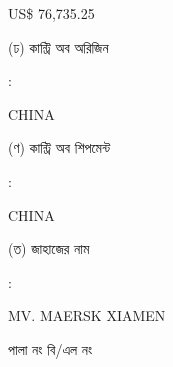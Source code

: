 \documentclass[12pt]{article}
\newcommand{\co}{CHINA}
\newcommand{\coship}{CHINA}
\newcommand{\vessel}{MV. MAERSK XIAMEN}
\newcommand{\price}{US\$ 76,735.25}
\begin{document}
\begin{minipage}[t]{0.50\linewidth}
{\price}
\\
\end{minipage}
\begin{minipage}[t]{0.05\linewidth}
\hspace*{1em}
\end{minipage}
\begin{minipage}[t]{0.45\linewidth}
(ঢ) কান্ট্রি অব অরিজিন
\end{minipage}
\begin{minipage}[t]{0.02\linewidth}
:
\end{minipage}
\begin{minipage}[t]{0.50\linewidth}
{\co}
\\
\end{minipage}
\begin{minipage}[t]{0.05\linewidth}
\hspace*{1em}
\end{minipage}
\begin{minipage}[t]{0.45\linewidth}
(ণ) কান্ট্রি অব শিপমেন্ট
\end{minipage}
\begin{minipage}[t]{0.02\linewidth}
:
\end{minipage}
\begin{minipage}[t]{0.50\linewidth}
{\coship}
\\
\end{minipage}
\begin{minipage}[t]{0.05\linewidth}
\hspace*{1em}
\end{minipage}
\begin{minipage}[t]{0.45\linewidth}
(ত) জাহাজের নাম
\end{minipage}
\begin{minipage}[t]{0.02\linewidth}
:
\end{minipage}
\begin{minipage}[t]{0.50\linewidth}
{\vessel}
\end{minipage}
\begin{minipage}[t]{0.05\linewidth}
\hspace*{1em}
\end{minipage}
\begin{minipage}[t]{0.45\linewidth}
\hspace*{1.8em}পালা নং বি/এল নং
\end{minipage}
\begin{minipage}[t]{0.02\linewidth}
\hspace{1em}
\end{minipage}
\end{document}

